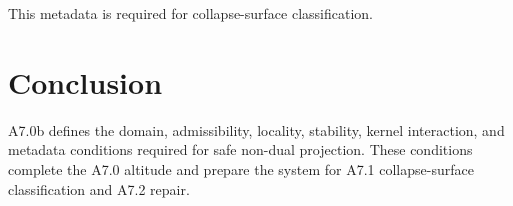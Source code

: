 \documentclass[11pt]{article}
\begin{document}
This metadata is required for collapse-surface classification.

\section{Conclusion}

A7.0b defines the domain, admissibility, locality, stability, kernel
interaction, and metadata conditions required for safe non-dual projection.
These conditions complete the A7.0 altitude and prepare the system for
A7.1 collapse-surface classification and A7.2 repair.
\end{document}

